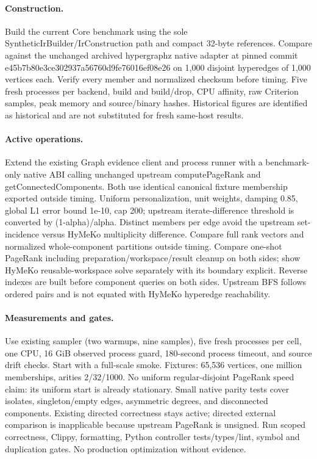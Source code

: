 \documentclass[11pt]{article}
\begin{document}
\paragraph{Construction.} Build the current Core benchmark using the sole
SyntheticIrBuilder/IrConstruction path and compact 32-byte references. Compare
against the unchanged archived hypergraphz native adapter at pinned commit
e45b7b80e3ce302937a56760d9fe76016ef08e26 on 1,000 disjoint hyperedges of 1,000
vertices each. Verify every member and normalized checksum before timing.
Five fresh processes per backend, build and build/drop, CPU affinity, raw
Criterion samples, peak memory and source/binary hashes. Historical figures are
identified as historical and are not substituted for fresh same-host results.
\paragraph{Active operations.} Extend the existing Graph evidence client and
process runner with a benchmark-only native ABI calling unchanged upstream
computePageRank and getConnectedComponents. Both use identical canonical fixture
membership exported outside timing. Uniform personalization, unit weights,
damping 0.85, global L1 error bound 1e-10, cap 200; upstream iterate-difference
threshold is converted by (1-alpha)/alpha. Distinct members per edge avoid the
upstream set-incidence versus HyMeKo multiplicity difference. Compare full rank
vectors and normalized whole-component partitions outside timing. Compare
one-shot PageRank including preparation/workspace/result cleanup on both sides;
show HyMeKo reusable-workspace solve separately with its boundary explicit.
Reverse indexes are built before component queries on both sides. Upstream BFS
follows ordered pairs and is not equated with HyMeKo hyperedge reachability.
\paragraph{Measurements and gates.} Use existing sampler (two warmups, nine
samples), five fresh processes per cell, one CPU, 16 GiB observed process guard,
180-second process timeout, and source drift checks. Start with a full-scale smoke.
Fixtures: 65,536 vertices, one million memberships, arities 2/32/1000. No uniform
regular-disjoint PageRank speed claim: its uniform start is already stationary.
Small native parity tests cover isolates, singleton/empty edges, asymmetric
degrees, and disconnected components. Existing directed correctness stays active;
directed external comparison is inapplicable because upstream PageRank is unsigned.
Run scoped correctness, Clippy, formatting, Python controller tests/types/lint,
symbol and duplication gates. No production optimization without evidence.
\end{document}
